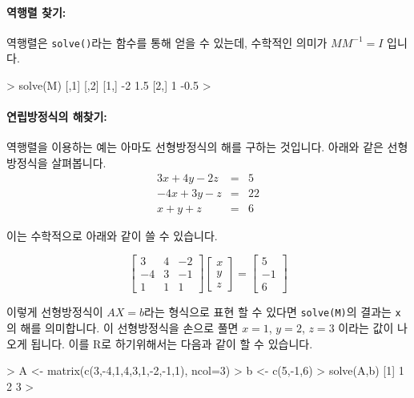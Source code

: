 \documentclass{book}
\begin{document}
\paragraph{역행렬 찾기:} 역행렬은 \texttt{solve()}라는 함수를 통해 얻을 수 있는데, 수학적인 의미가 $M M^{-1} = I$ 입니다.

\begin{Schunk}
\begin{Soutput}
> solve(M)
     [,1] [,2]
[1,]   -2  1.5
[2,]    1 -0.5
>
\end{Soutput}
\end{Schunk}


\paragraph{연립방정식의 해찾기:} 역행렬을 이용하는 예는 아마도 선형방정식의 해를 구하는 것입니다. 
아래와 같은 선형방정식을 살펴봅니다. 
\begin{eqnarray}
3x + 4y - 2z & = & 5 \\
-4x + 3y - z & = & 22 \\
x + y + z & = & 6
\end{eqnarray}

이는 수학적으로 아래와 같이 쓸 수 있습니다. 

\begin{equation}
	\begin{bmatrix}
		3 & 4 & -2 \\
		-4 & 3 & -1 \\
		1 & 1 & 1 
	\end{bmatrix}
\begin{bmatrix}
	x \\
	y \\
	z 
\end{bmatrix}
= 
\begin{bmatrix}
	5 \\
	-1 \\
	6 
\end{bmatrix}
\end{equation}

이렇게 선형방정식이 $AX=b$라는 형식으로 표현 할 수 있다면 \texttt{solve(M)}의 결과는 \texttt{x}의 해를 의미합니다.
이 선형방정식을 손으로 풀면 $x=1$, $y=2$, $z=3$ 이라는 값이 나오게 됩니다. 
이를 R로 하기위해서는 다음과 같이 할 수 있습니다. 

\begin{Schunk}
\begin{Soutput}
> A <- matrix(c(3,-4,1,4,3,1,-2,-1,1), ncol=3)
> b <- c(5,-1,6)
> solve(A,b)
[1] 1 2 3
> 
\end{Soutput}
\end{Schunk}
\end{document}
